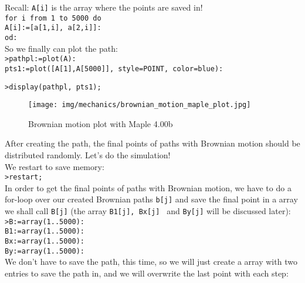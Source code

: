 \begin{tcolorbox}[colframe=black,colback=white,sharp corners]
    Recall: \texttt{A[i]} is the array where the points are saved in!\\
    \texttt{for i from 1 to 5000 do\\
                A[i]:=[a[1,i], a[2,i]]:\\
            od:}\\
           
    So we finally can plot the path:\\
    
    \texttt{>pathpl:=plot(A):\\
            pts1:=plot([A[1],A[5000]], style=POINT, color=blue):}\\
           
	\end{tcolorbox}
	
	\begin{tcolorbox}[colframe=black,colback=white,sharp corners]
	 \texttt{>display(pathpl, pts1);}\\
	\begin{figure}[H]
		\centering
		\texttt{[image: img/mechanics/brownian\_motion\_maple\_plot.jpg]}
		\caption[]{Brownian motion plot with Maple 4.00b}
	\end{figure}
	After creating the path, the final points of paths with Brownian motion should be distributed randomly. Let's do the simulation!\\
	
	We restart to save memory:\\
	
	 \texttt{>restart;}\\
	 
	 In order to get the final points of paths with Brownian motion, we have to do a for-loop over our created Brownian paths \texttt{b[j]} and save the final point in a array we shall call \texttt{B[j]} (the array \texttt{B1[j], Bx[j] } and \texttt{By[j]} will be discussed later):\\
	 
	 \texttt{>B:=array(1..5000):\\
			B1:=array(1..5000):\\
			Bx:=array(1..5000):\\
			By:=array(1..5000):}\\
 
 	We don't have to save the path, this time, so we will just create a array with two entries to save the path in, and we will overwrite the last point with each step:\\
 	

\end{tcolorbox}
